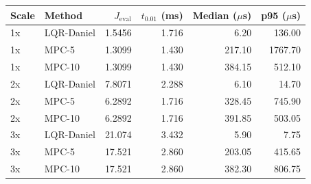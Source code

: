 \begin{tabular}{llrrrr}
\toprule
Scale & Method & $J_{\mathrm{eval}}$ & $t_{0.01}$ (ms) & Median ($\mu$s) & p95 ($\mu$s) \\ \midrule
1x & LQR-Daniel & 1.5456 & 1.716 & 6.20 & 136.00 \\ 
1x & MPC-5 & 1.3099 & 1.430 & 217.10 & 1767.70 \\ 
1x & MPC-10 & 1.3099 & 1.430 & 384.15 & 512.10 \\ 
2x & LQR-Daniel & 7.8071 & 2.288 & 6.10 & 14.70 \\ 
2x & MPC-5 & 6.2892 & 1.716 & 328.45 & 745.90 \\ 
2x & MPC-10 & 6.2892 & 1.716 & 391.85 & 503.05 \\ 
3x & LQR-Daniel & 21.074 & 3.432 & 5.90 & 7.75 \\ 
3x & MPC-5 & 17.521 & 2.860 & 203.05 & 415.65 \\ 
3x & MPC-10 & 17.521 & 2.860 & 382.30 & 806.75 \\ 
\bottomrule
\end{tabular}
